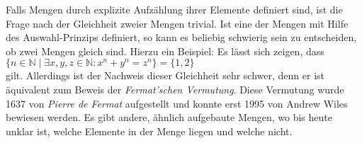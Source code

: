 Falls Mengen durch explizite Aufz\"{a}hlung ihrer Elemente definiert sind, ist die Frage nach
der Gleichheit zweier Mengen trivial.  Ist eine der Mengen mit Hilfe des Auswahl-Prinzips definiert, so
kann es beliebig schwierig sein zu entscheiden, ob zwei Mengen gleich sind.  Hierzu ein
Beispiel:  Es l\"{a}sst sich zeigen, dass \\[0.2cm]
\hspace*{1.3cm} 
$\{ n \in \mathbb{N} \mid \exists x, y, z\in\mathbb{N}: x^n + y^n = z^n \} = \{1,2\}$ \\[0.2cm]
gilt.  Allerdings ist der Nachweis dieser Gleichheit sehr schwer, denn er ist \"{a}quivalent
zum Beweis der \emph{Fermat'schen Vermutung}. Diese Vermutung wurde 1637
von {\sl Pierre de Fermat} aufgestellt und konnte erst 1995 von Andrew Wiles bewiesen werden.
Es gibt andere, \"{a}hnlich aufgebaute Mengen, wo bis heute unklar ist, welche Elemente in der
Menge liegen und welche nicht.


